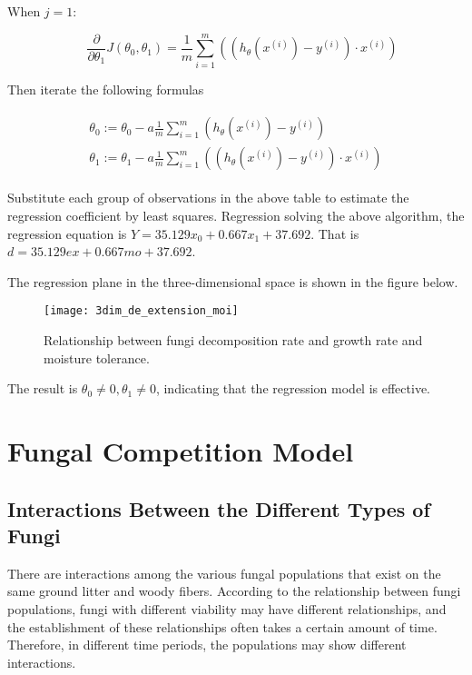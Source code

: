 \documentclass{mcmthesis}
\begin{document}
When $ j=1 $:

\begin{equation}
  \quad \frac{\partial}{\partial \theta_{1}} J\left(\theta_{0}, \theta_{1}\right)=\frac{1}{m} \sum_{i=1}^{m}\left(\left(h_{\theta}\left(x^{(i)}\right)-y^{(i)}\right) \cdot x^{(i)}\right)
\end{equation}

Then iterate the following formulas

\begin{equation}
  \begin{split}
    \begin{array}{l}
      \theta_{0}:=\theta_{0}-a \frac{1}{m} \sum_{i=1}^{m}\left(h_{\theta}\left(x^{(i)}\right)-y^{(i)}\right) \\
      \theta_{1}:=\theta_{1}-a \frac{1}{m} \sum_{i=1}^{m}\left(\left(h_{\theta}\left(x^{(i)}\right)-y^{(i)}\right) \cdot x^{(i)}\right)
    \end{array}
  \end{split}
\end{equation}

Substitute each group of observations in the above table to estimate the regression coefficient by least squares. Regression solving the above algorithm, the regression equation is $ Y = 35.129x_0 +0.667x_1 + 37.692 $. That is $ d = 35.129ex +0.667mo + 37.692 $.

The regression plane in the three-dimensional space is shown in the figure below.

\begin{figure}[H]
  \small
  \centering
  \texttt{[image: 3dim\_de\_extension\_moi]}
  \caption{Relationship between fungi decomposition rate and growth rate and moisture tolerance.}
  \label{3dim_de_extension_moi}
\end{figure}

The result is $ \theta_0\ne0,\theta_1\ne 0 $, indicating that the regression model is effective.

\section{Fungal Competition Model}

\subsection{Interactions Between the Different Types of Fungi}

There are interactions among the various fungal populations that exist on the same ground litter and woody fibers. According to the relationship between fungi populations, fungi with different viability may have different relationships, and the establishment of these relationships often takes a certain amount of time. Therefore, in different time periods, the populations may show different interactions.
\end{document}
